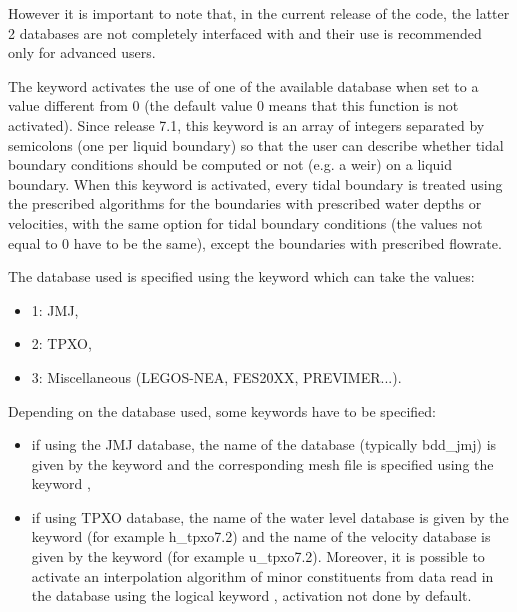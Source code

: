 However it is important to note that, in the current release of the code,
the latter 2 databases are not completely interfaced with 
and their use is recommended only for advanced users.

The keyword  activates the use of
one of the available database when set to a value different from 0
(the default value 0 means that this function is not activated). 
Since release 7.1, this keyword is an array of integers separated by semicolons
(one per liquid boundary) so that the user can describe whether tidal boundary
conditions should be computed or not (e.g. a weir) on a liquid boundary. 
When this keyword is activated, every tidal
boundary is treated using the prescribed algorithms for the boundaries with
prescribed water depths or velocities, with the same option for tidal boundary
conditions (the values not equal to 0 have to be the same),
except the boundaries with prescribed flowrate.

The database used is specified using the keyword 
which can take the values:

\begin{itemize}
\item 1: JMJ,

\item 2: TPXO,

\item 3: Miscellaneous (LEGOS-NEA, FES20XX, PREVIMER...).
\end{itemize}

Depending on the database used, some keywords have to be specified:

\begin{itemize}
\item if using the JMJ database, the name of the database (typically bdd\_jmj)
is given by the keyword  and the corresponding
mesh file is specified using the keyword ,

\item if using TPXO database, the name of the water level database is given
by the keyword  (for example h\_tpxo7.2)
and the name of the velocity database is given by the keyword
 (for example u\_tpxo7.2).
Moreover, it is possible to activate an interpolation algorithm of minor
constituents from data read in the database using the logical keyword
, activation not done by default.
\end{itemize}

